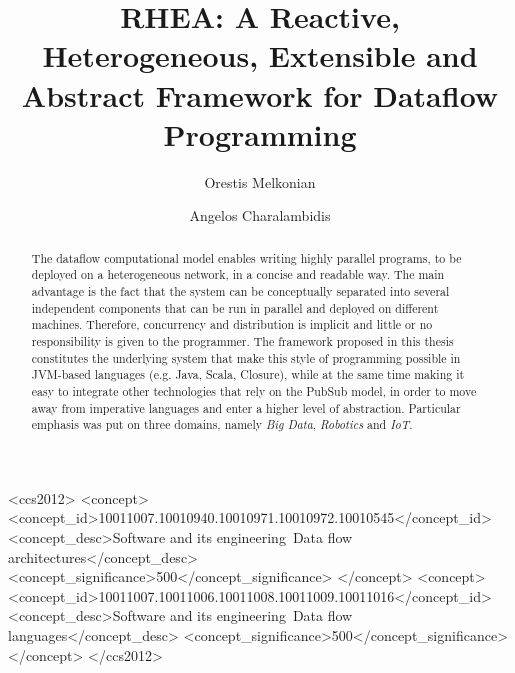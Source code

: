 \documentclass[sigplan,review,anonymous]{acmart}\settopmatter{printfolios=true,printacmref=false}
\begin{document}
\sloppy


\title[RHEA]{RHEA: A Reactive, Heterogeneous, Extensible and Abstract Framework for Dataflow Programming}
\subtitle{}

\author{Orestis Melkonian}

\author{Angelos Charalambidis}

\begin{abstract}
The dataflow computational model enables writing highly parallel programs, to
be deployed on a heterogeneous network, in a concise and readable way. The main
advantage is the fact that the system can be conceptually separated into several
independent components that can be run in parallel and deployed on different
machines. Therefore, concurrency and distribution is implicit and little or no
responsibility is given to the programmer. The framework proposed in this thesis
constitutes the underlying system that make this style of programming possible in
JVM-based languages (e.g. Java, Scala, Closure), while at the same time making it
easy to integrate other technologies that rely on the PubSub model, in order to
move away from imperative languages and enter a higher level of abstraction. Particular
emphasis was put on three domains, namely \textit{Big Data}, \textit{Robotics} and
\textit{IoT}.
\end{abstract}


\begin{CCSXML}
<ccs2012>
<concept>
<concept_id>10011007.10010940.10010971.10010972.10010545</concept_id>
<concept_desc>Software and its engineering~Data flow architectures</concept_desc>
<concept_significance>500</concept_significance>
</concept>
<concept>
<concept_id>10011007.10011006.10011008.10011009.10011016</concept_id>
<concept_desc>Software and its engineering~Data flow languages</concept_desc>
<concept_significance>500</concept_significance>
</concept>
</ccs2012>
\end{CCSXML}

\end{document}
